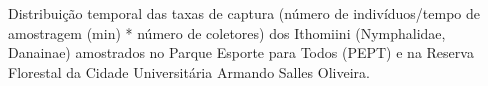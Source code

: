 Distribuição temporal das taxas de captura (número de indivíduos/tempo de amostragem (min) * número de coletores) dos Ithomiini (Nymphalidae, Danainae) amostrados no Parque Esporte para Todos (PEPT) e na Reserva Florestal da Cidade Universitária Armando Salles Oliveira. \label{fig:2.1.3}

